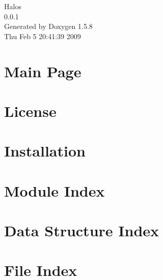 \documentclass[a4paper]{book}
\begin{document}
\begin{titlepage}
\vspace*{7cm}
\begin{center}
{\Large Halos \\[1ex]\large 0.0.1 }\\
\vspace*{1cm}
{\large Generated by Doxygen 1.5.8}\\
\vspace*{0.5cm}
{\small Thu Feb 5 20:41:39 2009}\\
\end{center}
\end{titlepage}
\clearemptydoublepage
{}
\tableofcontents
\clearemptydoublepage
{}
\chapter{Main Page}
\label{index}\hypertarget{index}{}
\chapter{License}
\label{License}
\hypertarget{License}{}

\chapter{Installation}
\label{Installation}
\hypertarget{Installation}{}

\chapter{Module Index}

\chapter{Data Structure Index}

\chapter{File Index}

\end{document}
